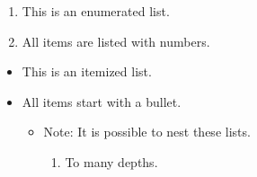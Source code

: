 \documentclass{IEEEtran}
\begin{document}
\begin{enumerate}
\item This is an enumerated list.
\item All items are listed with numbers.
\end{enumerate}

\begin{itemize}
\item This is an itemized list.
\item All items start with a bullet.
\begin{itemize}
\item Note:  It is possible to nest these lists.
\begin{enumerate}
\item To many depths.
\end{enumerate}
\end{itemize}
\end{itemize}



\nocite{*}

\end{document}
